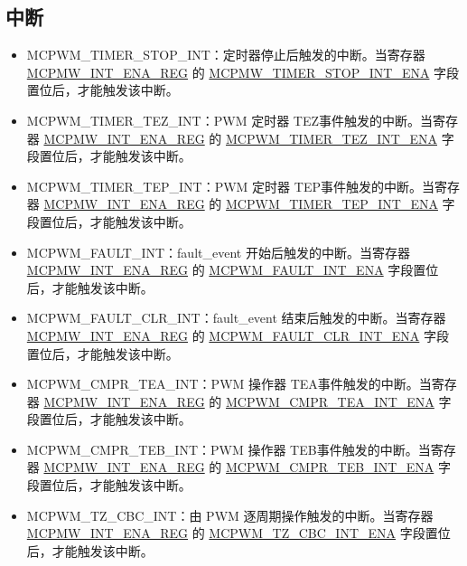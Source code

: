 \documentclass[main\_\_CN.tex]{subfiles}
\begin{document}
\subsection{中断}
\label{sec:mcpwm-interrupts}
\begin{itemize}
\item \label{int:mcpwm-timer-stop}MCPWM\_TIMER\_STOP\_INT：定时器停止后触发的中断。当寄存器 \hyperref[regdesc:MCPWMINTENAREG]{MCPMW\_INT\_ENA\_REG} 的 \hyperref[fielddesc:MCPWMTIMER0STOPINTENA]{MCPMW\_TIMER\_STOP\_INT\_ENA} 字段置位后，才能触发该中断。
\item \label{int:mcpwm-timer-TEZ}MCPWM\_TIMER\_TEZ\_INT：PWM 定时器 TEZ事件触发的中断。当寄存器 \hyperref[regdesc:MCPWMINTENAREG]{MCPMW\_INT\_ENA\_REG} 的 \hyperref[fielddesc:MCPWMTIMER0TEZINTENA]{MCPWM\_TIMER\_TEZ\_INT\_ENA} 字段置位后，才能触发该中断。
\item \label{int:mcpwm-timer-tep}MCPWM\_TIMER\_TEP\_INT：PWM 定时器 TEP事件触发的中断。当寄存器 \hyperref[regdesc:MCPWMINTENAREG]{MCPMW\_INT\_ENA\_REG} 的 \hyperref[fielddesc:MCPWMTIMER0TEPINTENA]{MCPWM\_TIMER\_TEP\_INT\_ENA} 字段置位后，才能触发该中断。
\item \label{int:mcpwm-fault}MCPWM\_FAULT\_INT：fault\_event 开始后触发的中断。当寄存器 \hyperref[regdesc:MCPWMINTENAREG]{MCPMW\_INT\_ENA\_REG} 的 \hyperref[fielddesc:MCPWMFAULT0INTENA]{MCPWM\_FAULT\_INT\_ENA} 字段置位后，才能触发该中断。
\item \label{int:mcpwm-fault-clr}MCPWM\_FAULT\_CLR\_INT：fault\_event 结束后触发的中断。当寄存器 \hyperref[regdesc:MCPWMINTENAREG]{MCPMW\_INT\_ENA\_REG} 的 \hyperref[fielddesc:MCPWMFAULT0CLRINTENA]{MCPWM\_FAULT\_CLR\_INT\_ENA} 字段置位后，才能触发该中断。
\item \label{int:mcpwm-cmpr-tea}MCPWM\_CMPR\_TEA\_INT：PWM 操作器 TEA事件触发的中断。当寄存器 \hyperref[regdesc:MCPWMINTENAREG]{MCPMW\_INT\_ENA\_REG} 的 \hyperref[fielddesc:MCPWMCMPR0TEAINTENA]{MCPWM\_CMPR\_TEA\_INT\_ENA} 字段置位后，才能触发该中断。
\item \label{int:mcpwm-cmpr-teb}MCPWM\_CMPR\_TEB\_INT：PWM 操作器 TEB事件触发的中断。当寄存器 \hyperref[regdesc:MCPWMINTENAREG]{MCPMW\_INT\_ENA\_REG} 的 \hyperref[fielddesc:MCPWMCMPR0TEBINTENA]{MCPWM\_CMPR\_TEB\_INT\_ENA} 字段置位后，才能触发该中断。
\item \label{int:mcpwm-tz-cbc}MCPWM\_TZ\_CBC\_INT：由 PWM 逐周期操作触发的中断。当寄存器 \hyperref[regdesc:MCPWMINTENAREG]{MCPMW\_INT\_ENA\_REG} 的 \hyperref[fielddesc:MCPWMTZ0CBCINTENA]{MCPWM\_TZ\_CBC\_INT\_ENA} 字段置位后，才能触发该中断。

\end{itemize}
\end{document}
